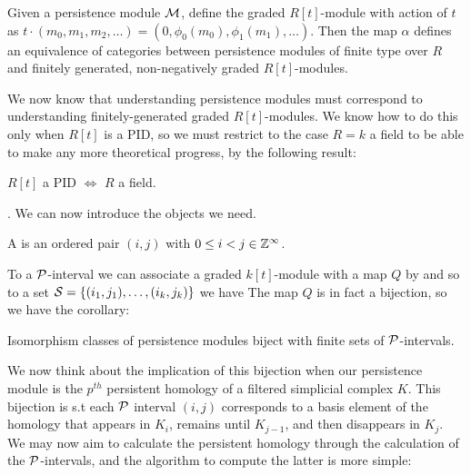 \documentclass{article}
\begin{document}
\begin{theorem}
	Given a persistence module $\mathcal{M}$, define the graded $R[t]$-module 
with action of $t$ as $t \cdot (m_0, m_1, m_2, \dots) = (0, \phi_0(m_0), \phi_1(m_1), \dots )$. Then the map $\alpha$ defines an equivalence of categories between persistence modules of finite type over $R$ and finitely generated, non-negatively graded $R[t]$-modules.
\end{theorem}

We now know that understanding persistence modules must correspond to understanding finitely-generated graded $R[t]$-modules. We know how to do this only when $R[t]$ is a PID, so we must restrict to the case $R=k$ a field to be able to make any more theoretical progress, by the following result:
\begin{prop}
	$R[t]$ a PID $\Leftrightarrow$ $R$ a field. 
\end{prop}
. We can now introduce the objects we need. 

\begin{definition}
	A  is an ordered pair $(i,j)$ with $0 \leq i < j  \in \mathbb{Z}^\infty$.
\end{definition}

To a $\mathcal{P}$-interval we can associate a graded $k[t]$-module with a map $Q$ by 
and so to a set $\mathcal{S} = \left\{ (i_1,j_1), \dots, (i_k,j_k) \right\}$ we have 
The map $Q$ is in fact a bijection, so we have the corollary:
\begin{corollary}
	Isomorphism classes of persistence modules biject with finite sets of $\mathcal{P}$-intervals. 
\end{corollary}

We now think about the implication of this bijection when our persistence module is the $p^{th}$ persistent homology of a filtered simplicial complex $K$. This bijection is s.t each $\mathcal{P}$ interval $(i,j)$ corresponds to a basis element of the homology that appears in $K_i$, remains until $K_{j-1}$, and then disappears in $K_{j}$. \\
We may now aim to calculate the persistent homology through the calculation of the $\mathcal{P}$-intervals, and the algorithm to compute the latter is more simple: 
\vspace{3mm}
\end{document}
